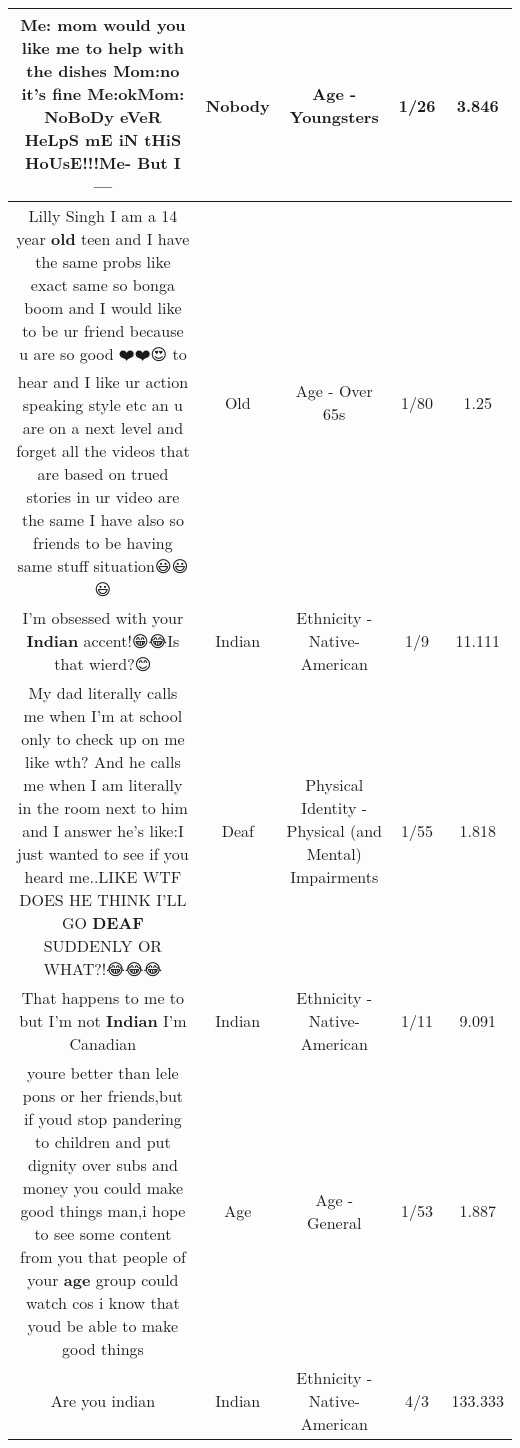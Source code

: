 \documentclass[11pt]{article}
\newlength\mylength
\begin{document}
\begin{center}
\begin{longtable}{|C{.65\mylength}|C{.30\mylength}|C{.12\mylength}|C{.12\mylength}|C{.12\mylength}|}
  \small Me: mom would you like me to help  with the dishes Mom:no it's fine Me:okMom: \textbf{NoBoDy} eVeR HeLpS mE iN tHiS HoUsE!!!Me- But I—\normalsize   & Nobody & Age - Youngsters & 1/26 & 3.846 \\  \hline
  \small Lilly Singh I am a 14 year \textbf{old} teen and I have the same probs like exact same so bonga boom  and I would like to be ur friend because u are so good ❤️❤️😍 to hear and I like ur action speaking style etc an u are on a next level and forget all the videos that are based on trued stories in ur video are the same I have also so friends to be having same stuff  situation😃😃😃\normalsize   & Old & Age - Over 65s & 1/80 & 1.25 \\  \hline
  \small I'm obsessed with your \textbf{Indian} accent!😁😂Is that wierd?😊\normalsize   & Indian & Ethnicity - Native-American & 1/9 & 11.111 \\  \hline
  \small My dad literally calls me when I'm at school only to check up on me like wth? And he calls me when I am literally in the room next to him and I answer he's like:I just wanted to see if you heard me..LIKE WTF DOES HE THINK I'LL GO \textbf{DEAF} SUDDENLY OR WHAT?!😂😂😂\normalsize   & Deaf & Physical Identity - Physical (and Mental) Impairments & 1/55 & 1.818 \\  \hline
  \small That happens to me to but I'm not \textbf{Indian} I'm Canadian\normalsize   & Indian & Ethnicity - Native-American & 1/11 & 9.091 \\  \hline
  \small youre better than lele pons or her friends,but if youd stop pandering to children and put dignity over subs and money you could make good things man,i hope to see some content from you that people of your \textbf{age} group could watch cos i know that youd be able to make good things\normalsize   & Age & Age - General & 1/53 & 1.887 \\  \hline
  \small Are you indian\normalsize   & Indian & Ethnicity - Native-American & 4/3 & 133.333 \\  \hline

\end{longtable}
\end{center}
\end{document}
